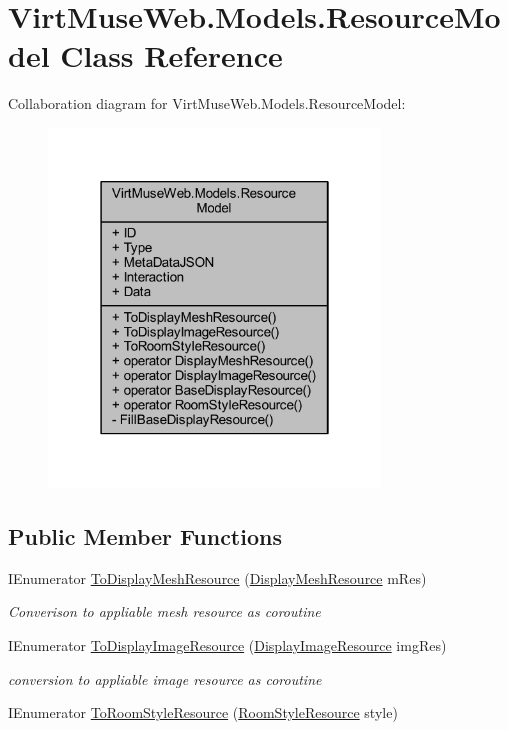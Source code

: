 \hypertarget{class_virt_muse_web_1_1_models_1_1_resource_model}{}\section{Virt\+Muse\+Web.\+Models.\+Resource\+Model Class Reference}
\label{class_virt_muse_web_1_1_models_1_1_resource_model}


Collaboration diagram for Virt\+Muse\+Web.\+Models.\+Resource\+Model\+:
\nopagebreak
\begin{figure}[H]
\begin{center}
\leavevmode
\includegraphics[width=250pt]{class_virt_muse_web_1_1_models_1_1_resource_model__coll__graph}
\end{center}
\end{figure}
\subsection*{Public Member Functions}
\begin{DoxyCompactItemize}
\item 
I\+Enumerator \mbox{\hyperlink{class_virt_muse_web_1_1_models_1_1_resource_model_a57f31b86ab776544b1f5480d7efc1a9c}{To\+Display\+Mesh\+Resource}} (\mbox{\hyperlink{class_display_mesh_resource}{Display\+Mesh\+Resource}} m\+Res)
\begin{DoxyCompactList}\small\item\em Converison to appliable mesh resource as coroutine \end{DoxyCompactList}\item 
I\+Enumerator \mbox{\hyperlink{class_virt_muse_web_1_1_models_1_1_resource_model_a4ff757b0ed17663d3d503dbb4decff7b}{To\+Display\+Image\+Resource}} (\mbox{\hyperlink{class_display_image_resource}{Display\+Image\+Resource}} img\+Res)
\begin{DoxyCompactList}\small\item\em conversion to appliable image resource as coroutine \end{DoxyCompactList}\item 
I\+Enumerator \mbox{\hyperlink{class_virt_muse_web_1_1_models_1_1_resource_model_ae85d25e8e130285ea18964b535f82f41}{To\+Room\+Style\+Resource}} (\mbox{\hyperlink{class_room_style_resource}{Room\+Style\+Resource}} style)
\end{DoxyCompactItemize}
